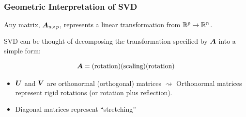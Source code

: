 \documentclass{beamer}
\begin{document}
\begin{frame}
  \frametitle{Geometric Interpretation of SVD}

Any matrix, $\bm{A}_{n \times p}$, represents a linear transformation from $\mathbb{R}^p \mapsto  \mathbb{R}^n$. 

\medskip
SVD can be thought of decomposing the transformation specified by $\bm{A}$ into a simple form:

$$ \bm{A} = (\text{rotation})(\text{scaling)}(\text{rotation})$$

\begin{itemize}
\item $\bm{U}$ and $\bm{V}$ are orthonormal (orthogonal) matrices $\rightsquigarrow$ Orthonormal matrices represent rigid rotations (or rotation plus reflection).
\item Diagonal matrices represent ``stretching''
\end{itemize}


\end{frame}






\end{document}
